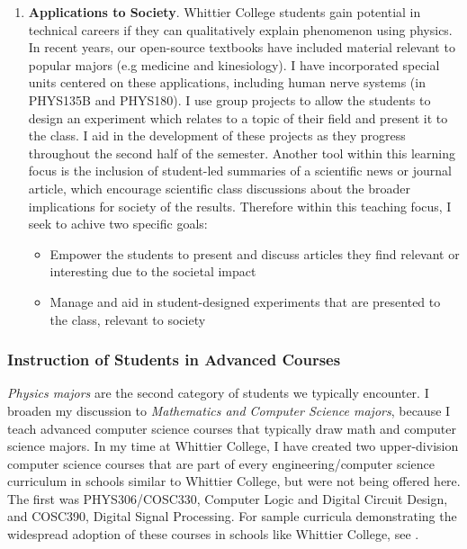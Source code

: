 \documentclass[../../main.tex]{subfiles}
\begin{document}
\begin{enumerate}
\item \textbf{Applications to Society}. Whittier College students gain potential in technical careers if they can qualitatively explain phenomenon using physics.  In recent years, our open-source textbooks \cite{openstax1} \cite{openstax2} have included material relevant to popular majors (e.g medicine and kinesiology). I have incorporated special units centered on these applications, including human nerve systems (in PHYS135B and PHYS180).  I use group projects to allow the students to design an experiment which relates to a topic of their field and present it to the class.  I aid in the development of these projects as they progress throughout the second half of the semester.  Another tool within this learning focus is the inclusion of student-led summaries of a scientific news or journal article, which encourage scientific class discussions about the broader implications for society of the results.  Therefore within this teaching focus, I seek to achive two specific goals:

\begin{itemize}
\item Empower the students to present and discuss articles they find relevant or interesting due to the societal impact %
\item Manage and aid in student-designed experiments that are presented to the class, relevant to society %
\end{itemize}

\end{enumerate}

\subsubsection{Instruction of Students in Advanced Courses}

\label{sec:teaching_phil2}

\textit{Physics majors} are the second category of students we typically encounter.  I broaden my discussion to \textit{Mathematics and Computer Science majors}, because I teach advanced computer science courses that typically draw math and computer science majors.  In my time at Whittier College, I have created two upper-division computer science courses that are part of every engineering/computer science curriculum in schools similar to Whittier College, but were not being offered here.  The first was PHYS306/COSC330, Computer Logic and Digital Circuit Design, and COSC390, Digital Signal Processing.  For sample curricula demonstrating the widespread adoption of these courses in schools like Whittier College, see \cite{BiolaCR} \cite{LMUCR}. \\ \hspace{0.1cm}
\end{document}
